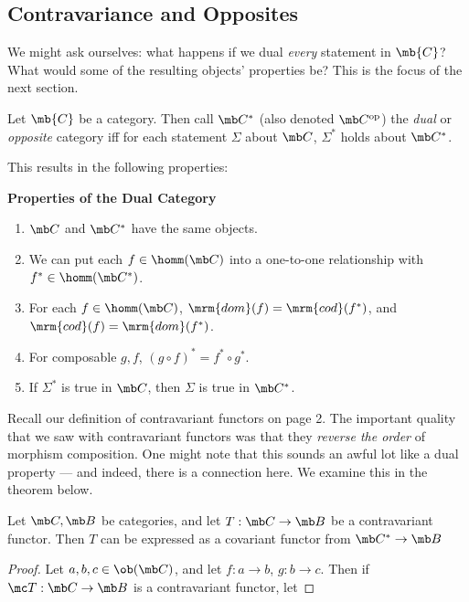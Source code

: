 \documentclass{fkbook}
\theoremstyle{snazzydefinition}
\renewcommand{\dom}{\mrm{dom}}
\renewcommand{\cod}{\mrm{cod}}
\begin{document}
\begin{adjustwidth}{1em}{1em}
  \subsection{Contravariance and Opposites}
  We might ask ourselves: what happens if we dual \emph{every}
  statement in $\mb{C}$? What would some of the resulting objects'
  properties be? This is the focus of the next section.
  \begin{definition}
    Let $\mb{C}$ be a category. Then call $\mb C^*$ (also denoted
    $\mb C^{\rm op}$) the \emph{dual} or \emph{opposite} category iff
    for each statement $\Sigma$ about $\mb C$, $\Sigma^*$ holds about
    $\mb C^*$.
  \end{definition}
  This results in the following properties:
  \begin{leftbar}
    {\large \bfseries Properties of the Dual Category}
    \begin{enumerate}[label=\arabic*)]
      \item $\mb C$ and $\mb C^*$ have the same objects.
      \item We can put each $f \in \homm(\mb C)$ into a one-to-one
        relationship with $f^* \in \homm(\mb C^*)$.
      \item For each $f \in \homm(\mb C)$, $\dom(f) = \cod(f^*)$, and
        $\cod(f) = \dom(f^*)$.
      \item For composable $g,f$, $(g \circ f)^* = f^* \circ g^*$.
      \item If $\Sigma^*$ is true in $\mb C$, then $\Sigma$ is true in
        $\mb C^*$.
    \end{enumerate}
  \end{leftbar}
  Recall our definition of contravariant functors on page 2. The
  important quality that we saw with contravariant functors was that
  they \emph{reverse the order} of morphism composition. One might
  note that this sounds an awful lot like a dual property --- and
  indeed, there is a connection here. We examine this in the theorem
  below.
  \begin{theorem}
    Let $\mb C, \mb B$ be categories, and let $T : \mb C \to \mb B$ be
    a contravariant functor. Then $T$ can be expressed as a covariant
    functor from $\mb C^* \to \mb B$
  \end{theorem}
  \begin{proof}
    Let $a,b,c \in \ob(\mb C)$, and let $f : a \to b$, $g : b \to c$.
    Then if $\mc T : \mb C \to \mb B$ is a contravariant functor, let

\end{proof}
\end{adjustwidth}
\end{document}
